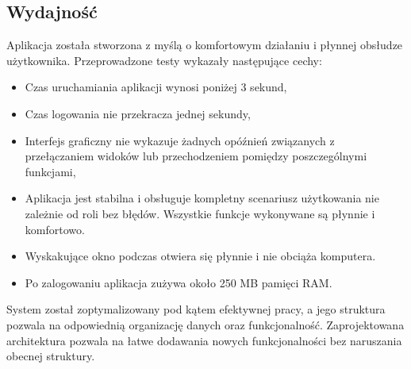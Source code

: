 \subsection{Wydajność}
\label{wydajność}
Aplikacja  została stworzona z myślą o komfortowym działaniu i płynnej obsłudze użytkownika. Przeprowadzone testy wykazały następujące cechy:
\begin{itemize}
      \item Czas uruchamiania aplikacji wynosi poniżej 3 sekund,
      \item Czas logowania nie przekracza jednej sekundy,
      \item Interfejs graficzny nie wykazuje żadnych opóźnień związanych z przełączaniem widoków lub przechodzeniem pomiędzy poszczególnymi funkcjami,
      \item Aplikacja jest stabilna i obsługuje kompletny scenariusz użytkowania nie zależnie od roli bez błędów. Wszystkie funkcje wykonywane są płynnie i komfortowo.
      \item Wyskakujące okno podczas otwiera się płynnie i nie obciąża komputera.
      \item Po zalogowaniu aplikacja zużywa około 250 MB pamięci RAM.
\end{itemize}
System został zoptymalizowany pod kątem efektywnej pracy, a jego struktura pozwala na odpowiednią organizację danych oraz funkcjonalność. Zaprojektowana architektura pozwala na łatwe dodawania nowych funkcjonalności bez naruszania obecnej struktury.

